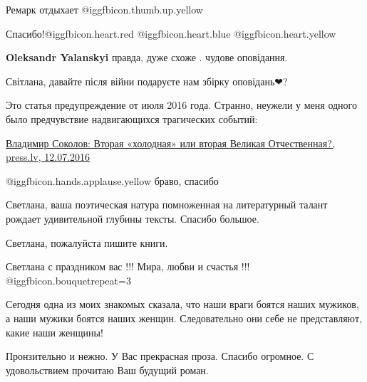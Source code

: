  
 
 
 
 
\zzSecCmt

\begin{itemize} %
Ремарк отдыхает  @igg{fbicon.thumb.up.yellow} 

\begin{itemize} %

Спасибо!@igg{fbicon.heart.red} @igg{fbicon.heart.blue}  @igg{fbicon.heart.yellow} 

\textbf{Oleksandr Yalanskyi} правда, дуже схоже . чудове оповідання.

Світлана, давайте після війни подаруєте нам збірку оповідань❤?
\end{itemize} %


Это статья предупреждение от июля 2016 года. Странно, неужели у меня одного
было предчувствие надвигающихся трагических событий:

\href{press.lv/post/vladimir-sokolov-vtoraya-holodnaya-ili-vtoraya-velikaya-otchestvennaya}{%
Владимир Соколов: Вторая «холодная» или вторая Великая Отчественная?, press.lv, 12.07.2016%
}

 @igg{fbicon.hands.applause.yellow}  браво, спасибо


Светлана, ваша поэтическая натура помноженная на литературный талант рождает
удивительной глубины тексты. Спасибо большое.

Светлана, пожалуйста пишите книги.

Светлана с праздником вас !!! Мира, любви и счастья !!! @igg{fbicon.bouquet}{repeat=3} 


Сегодня одна из моих знакомых сказала, что наши враги боятся наших мужиков, а
наши мужики боятся наших женщин. Следовательно они себе не представляют, какие
наши женщины!


Пронзительно и нежно. У Вас прекрасная проза. Спасибо огромное. С удовольствием прочитаю Ваш будущий роман.


\end{itemize}

